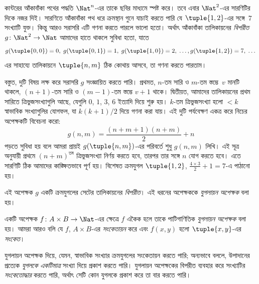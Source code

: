 \documentclass[../../../include/open-logic-section]{subfiles}
\begin{document}

\begin{explain}
কান্টরের আঁকাবাঁকা পথের পদ্ধতি $\Nat^n$-এর তাকে ছবির মাধ্যমে স্পষ্ট করে। তবে এবার $\Nat^2$-এর সারণিটির দিকে নজর দিই। সারণিতে আঁকাবাঁকা পথ ধরে ক্রমস্থান গুনে যাচাই করতে পারি যে $\tuple{1,2}$-এর সঙ্গে~$7$ সংখ্যাটি যুক্ত। কিন্তু আরও সরাসরি এটি গণনা করতে পারলে ভালো হতো। অর্থাৎ আঁকাবাঁকা তালিকায়নের \emph{বিপরীত} $g\colon \Nat^2 \to \Nat$ আমাদের হাতে থাকলে সুবিধা হতো, যাতে
\[
g(\tuple{0,0}) = 0, \;
g(\tuple{0,1}) = 1, \;
g(\tuple{1,0}) = 2, \; \dots,
g(\tuple{1,2}) = 7, \; \dots
\]
এর সাহায্যে তালিকায়নে $\tuple{n, m}$ ঠিক কোথায় আসবে, তা গণনা করতে পারতাম।

বস্তুত, দুটি বিষয় লক্ষ করে সরাসরি $g$ সংজ্ঞায়িত করতে পারি। প্রথমত, $n$-তম সারি ও $m$-তম স্তম্ভে~$v$ মানটি থাকলে, $(n+1)$-তম সারি ও $(m-1)$-তম স্তম্ভে $v + 1$ থাকে। দ্বিতীয়ত, আমাদের তালিকায়নের প্রথম সারিতে ত্রিভুজসংখ্যাগুলি আছে, যেগুলি $0$, $1$, $3$, $6$ ইত্যাদি দিয়ে শুরু হয়। $k$-তম ত্রিভুজসংখ্যা হলো $< k$ স্বাভাবিক সংখ্যাগুলির যোগফল, যা $k(k+1)/2$ দিয়ে গণনা করা যায়। এই দুটি পর্যবেক্ষণ একত্র করে নিচের অপেক্ষকটি বিবেচনা করো:
\[
  g(n,m) = \frac{(n+m+1)(n+m)}{2} + n
\]
পড়তে সুবিধা হয় বলে আমরা প্রায়ই $g(\tuple{n, m})$-এর পরিবর্তে শুধু $g(n, m)$ লিখি। এই সূত্র অনুযায়ী প্রথমে $(n+m)^\text{তম}$ ত্রিভুজসংখ্যা নির্ণয় করতে হবে, তারপর তার সঙ্গে $n$ যোগ করতে হবে। এতে সারণিটি ঠিক আমাদের কাঙ্ক্ষিতভাবে পূর্ণ হয়। বিশেষত ক্রমযুগল $\tuple{1, 2}$, $\frac{4 \times 3}{2} +
1 = 7$-এ পাঠানো হয়।

এই অপেক্ষক $g$ একটি ক্রমযুগলের সেটের তালিকায়নের \emph{বিপরীত}। এই ধরনের অপেক্ষককে \emph{যুগলায়ন অপেক্ষক} বলা হয়।
\end{explain}

\begin{defn}[যুগলায়ন অপেক্ষক]
  একটি অপেক্ষক $f\colon A \times B \to \Nat$-এর ক্ষেত্রে $f$ একৈক হলে তাকে পাটিগাণিতিক \emph{যুগলায়ন অপেক্ষক} বলা হয়। আমরা আরও বলি যে $f$, $A \times B$-এর \emph{সংকেতায়ন} করে এবং $f(x,y)$ হলো $\tuple{x,y}$-এর \emph{সংকেত}।
\end{defn}

\begin{explain}
যুগলায়ন অপেক্ষক দিয়ে, যেমন, স্বাভাবিক সংখ্যার ক্রমযুগলের সংকেতায়ন করতে পারি; অন্যভাবে বললে, উপাদানের প্রত্যেক \emph{যুগলকে} \emph{একটিমাত্র} সংখ্যা দিয়ে প্রকাশ করতে পারি। যুগলায়ন অপেক্ষকের বিপরীত ব্যবহার করে সংখ্যাটির \emph{সংকেতোদ্ধার} করতে পারি, অর্থাৎ সেটি কোন যুগলকে প্রকাশ করে তা বার করতে পারি।
\end{explain}
\end{document}
